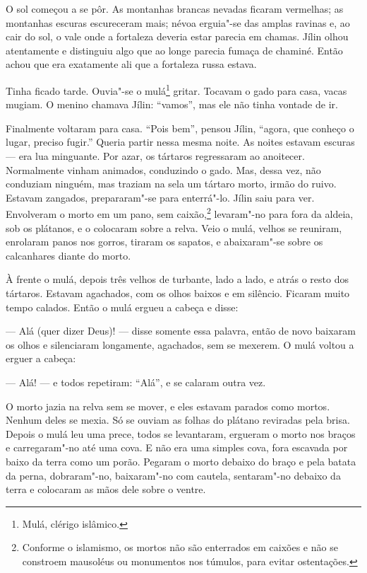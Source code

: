 O sol começou a se pôr. As montanhas brancas nevadas ficaram vermelhas;
as montanhas escuras escureceram mais; névoa erguia"-se das amplas
ravinas e, ao cair do sol, o vale onde a fortaleza deveria estar parecia
em chamas. Jílin olhou atentamente e distinguiu algo que ao longe
parecia fumaça de chaminé. Então achou que era exatamente ali que a
fortaleza russa estava.

Tinha ficado tarde. Ouvia"-se o mulá\footnote{Mulá, clérigo islâmico.}
gritar. Tocavam o gado para casa, vacas mugiam. O menino chamava Jílin:
``vamos'', mas ele não tinha vontade de ir.

Finalmente voltaram para casa. ``Pois bem'', pensou Jílin, ``agora, que
conheço o lugar, preciso fugir.'' Queria partir nessa mesma noite. As
noites estavam escuras --- era lua minguante. Por azar, os tártaros
regressaram ao anoitecer. Normalmente vinham animados, conduzindo o
gado. Mas, dessa vez, não conduziam ninguém, mas traziam na sela um
tártaro morto, irmão do ruivo. Estavam zangados, prepararam"-se para
enterrá"-lo. Jílin saiu para ver. Envolveram o morto em um pano, sem
caixão,\footnote{Conforme o islamismo, os mortos não são enterrados em
  caixões e não se constroem mausoléus ou monumentos nos túmulos, para
  evitar ostentações.} levaram"-no para fora da aldeia, sob os plátanos,
e o colocaram sobre a relva. Veio o mulá, velhos se reuniram, enrolaram
panos nos gorros, tiraram os sapatos, e abaixaram"-se sobre os
calcanhares diante do morto.

À frente o mulá, depois três velhos de turbante, lado a lado, e atrás o
resto dos tártaros. Estavam agachados, com os olhos baixos e em
silêncio. Ficaram muito tempo calados. Então o mulá ergueu a cabeça e
disse:

--- Alá (quer dizer Deus)! --- disse somente essa palavra, então de novo
baixaram os olhos e silenciaram longamente, agachados, sem se mexerem. O
mulá voltou a erguer a cabeça:

--- Alá! --- e todos repetiram: ``Alá'', e se calaram outra vez.

O morto jazia na relva sem se mover, e eles estavam parados como mortos.
Nenhum deles se mexia. Só se ouviam as folhas do plátano reviradas pela
brisa. Depois o mulá leu uma prece, todos se levantaram, ergueram o
morto nos braços e carregaram"-no até uma cova. E não era uma simples
cova, fora escavada por baixo da terra como um porão. Pegaram o morto
debaixo do braço e pela batata da perna, dobraram"-no, baixaram"-no com
cautela, sentaram"-no debaixo da terra e colocaram as mãos dele sobre o
ventre.


